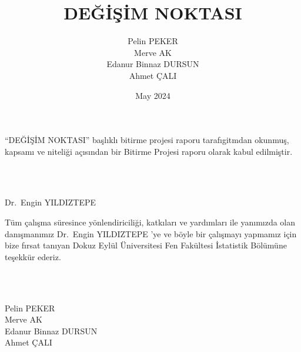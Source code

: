 \documentclass[12pt,twoside]{deuthesis}
\title{DEĞİŞİM NOKTASI}
\author{Pelin PEKER \\ Merve AK \\ Edanur Binnaz DURSUN \\ Ahmet ÇALI} %
\date{May 2024}
\begin{document}
  \maketitle

\frontmatter %
\pagestyle{empty} %

\begin{preface}
	``DEĞİŞİM NOKTASI'' başlıklı bitirme projesi raporu tarafıgitmdan okunmuş, kapsamı ve niteliği açısından bir Bitirme Projesi raporu olarak kabul edilmiştir.\\
\strut \\
\strut \\
Dr.~Engin YILDIZTEPE
\end{preface}

  \begin{acknowledgements}
    Tüm çalışma süresince yönlendiriciliği, katkıları ve yardımları ile yanımızda olan danışmanımız Dr.~Engin YILDIZTEPE 'ye ve böyle bir çalışmayı yapmamız için bize fırsat tanıyan Dokuz Eylül Üniversitesi Fen Fakültesi İstatistik Bölümüne teşekkür ederiz.\\
    \strut \\
    \strut \\
    Pelin PEKER\\
    Merve AK\\
    Edanur Binnaz DURSUN\\
    Ahmet ÇALI\\
  \end{acknowledgements}
\end{document}

